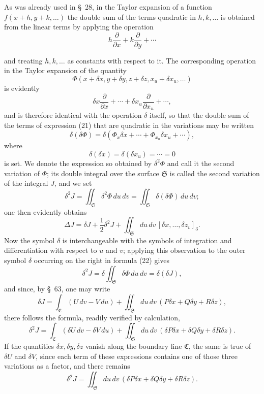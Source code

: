 \documentclass[11pt,a4paper,leqno]{article}
\begin{document}
As was already used in \S~28, in the Taylor expansion of a function
$f(x+h,y+k,\ldots)$ the double sum of the terms quadratic in
$h,k,\ldots$ is obtained from the linear terms by applying the operation
\[
h\frac{\partial}{\partial x}+k\frac{\partial}{\partial y}+\cdots
\]

and treating $h,k,\ldots$ as constants with respect to it. The corresponding
operation in the Taylor expansion of the quantity
\begin{equation}\tag{21}
\Phi(x+\delta x,y+\delta y,z+\delta z,x_u+\delta x_u,\ldots)
\end{equation}
is evidently
\[
\delta x\frac{\partial}{\partial x}+\cdots
+\delta x_u\frac{\partial}{\partial x_u}+\cdots,
\]
and is therefore identical with the operation $\delta$ itself, so that the
double sum of the terms of expression (21) that are quadratic in the
variations may be written
\[
\delta(\delta\Phi)
=\delta(\Phi_x\delta x+\cdots+\Phi_{x_u}\delta x_u+\cdots),
\]
where
\[
\delta(\delta x)=\delta(\delta x_u)=\cdots=0
\]
is set. We denote the expression so obtained by $\delta^2\Phi$ and call it
the second variation of $\Phi$; its double integral over the surface
$\mathfrak{S}$ is called the second variation of the integral $J$, and we
set
\begin{equation}\tag{22}
\delta^2J=\iint_{\mathfrak{S}}\delta^2\Phi\,du\,dv
=\iint_{\mathfrak{S}}\delta(\delta\Phi)\,du\,dv;
\end{equation}
one then evidently obtains
\[
\Delta J=\delta J+\frac12\delta^2J
+\iint_{\mathfrak{S}}du\,dv\,[\delta x,\ldots,\delta z_v]_3.
\]
Now the symbol $\delta$ is interchangeable with the symbols of integration
and differentiation with respect to $u$ and $v$; applying this observation
to the outer symbol $\delta$ occurring on the right in formula (22) gives
\[
\delta^2J=\delta\iint_{\mathfrak{S}}\delta\Phi\,du\,dv
=\delta(\delta J),
\]
and since, by \S~63, one may write
\begin{equation}\tag{23}
\delta J=\int_{\mathfrak{C}}(U\,dv-V\,du)
+\iint_{\mathfrak{S}}du\,dv\,(P\delta x+Q\delta y+R\delta z),
\end{equation}
there follows the formula, readily verified by calculation,
\[
\delta^2J=\int_{\mathfrak{C}}(\delta U\,dv-\delta V\,du)
+\iint_{\mathfrak{S}}du\,dv\,
(\delta P\delta x+\delta Q\delta y+\delta R\delta z).
\]
If the quantities $\delta x,\delta y,\delta z$ vanish along the boundary
line $\mathfrak{C}$, the same is true of $\delta U$ and $\delta V$, since
each term of these expressions contains one of those three variations as a
factor, and there remains
\[
\delta^2J=\iint_{\mathfrak{S}}du\,dv\,
(\delta P\delta x+\delta Q\delta y+\delta R\delta z).
\]
\end{document}
